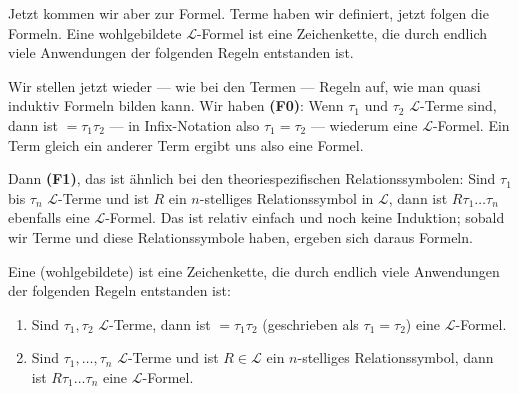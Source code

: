 \begin{spoken-clean}[00:57:29 - 00:59:59]
Jetzt kommen wir aber zur Formel. Terme haben wir definiert, jetzt folgen die Formeln. Eine wohlgebildete $\mathcal{L}$-Formel ist eine Zeichenkette, die durch endlich viele Anwendungen der folgenden Regeln entstanden ist. 

Wir stellen jetzt wieder --- wie bei den Termen --- Regeln auf, wie man quasi induktiv Formeln bilden kann. Wir haben \textbf{(F0)}: Wenn $\tau_1$ und $\tau_2$ $\mathcal{L}$-Terme sind, dann ist $=\tau_1\tau_2$ --- in Infix-Notation also $\tau_1 = \tau_2$ --- wiederum eine $\mathcal{L}$-Formel. Ein Term gleich ein anderer Term ergibt uns also eine Formel. 

Dann \textbf{(F1)}, das ist ähnlich bei den theoriespezifischen Relationssymbolen: Sind $\tau_1$ bis $\tau_n$ $\mathcal{L}$-Terme und ist $R$ ein $n$-stelliges Relationssymbol in $\mathcal{L}$, dann ist $R\tau_1\dots\tau_n$ ebenfalls eine $\mathcal{L}$-Formel.  Das ist relativ einfach und noch keine Induktion; sobald wir Terme und diese Relationssymbole haben, ergeben sich daraus Formeln.
\end{spoken-clean}

\begin{math-stroke}
Eine (wohlgebildete)  ist eine Zeichenkette, die durch endlich viele Anwendungen der folgenden Regeln entstanden ist:
\begin{enumerate}[label=\textbf{(F\arabic*)}, start=0]
    \item Sind $\tau_1, \tau_2$ $\mathcal{L}$-Terme, dann ist $= \tau_1 \tau_2$ (geschrieben als $\tau_1 = \tau_2$) eine $\mathcal{L}$-Formel.
    \item Sind $\tau_1, \dots, \tau_n$ $\mathcal{L}$-Terme und ist $R \in \mathcal{L}$ ein $n$-stelliges Relationssymbol, dann ist $R \tau_1 \dots \tau_n$ eine $\mathcal{L}$-Formel.
\end{enumerate}
\end{math-stroke}

